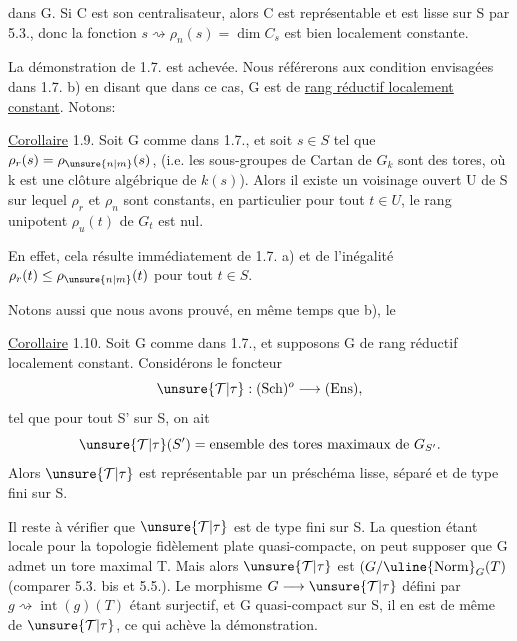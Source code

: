 dans G. Si C est son centralisateur, alors C est représentable et est
lisse sur S par  5.3., donc la fonction
$s\rightsquigarrow\rho_n(s)=\dim C_s$ est bien
localement constante.

La démonstration de 1.7. est achevée. Nous référerons aux
condition envisagées dans 1.7. b) en disant que dans ce cas, G est
de \uline{rang réductif localement constant}. Notons:

\uline{Corollaire} 1.9. Soit G comme dans 1.7., et soit $s\in S$ tel que
$\rho_r(s)=\rho_{\unsure{n|m}}(s)$, (i.e. les sous-groupes de Cartan de $G_k$ sont des tores, où k
est une clôture algébrique de $k(s)$). Alors il existe un voisinage 
ouvert U de S sur lequel $\rho_r$ et $\rho_n$ sont constants, en particulier pour
tout $t\in U$, le rang unipotent $\rho_u(t)$ de $G_t$ est nul.

En effet,  cela
résulte immédiatement de 1.7. a) et de l'inégalité $\rho_r(t)\le\rho_{\unsure{n|m}}(t)$ pour
tout $t\in S$.

Notons aussi que nous avons prouvé, en même temps que b), le

\uline{Corollaire} 1.10. Soit G comme dans 1.7., et supposons G de rang
réductif localement constant. Considérons le foncteur
\[
\unsure{\mathcal T|\tau}:(\mathrm{Sch})^o\longrightarrow(\mathrm{Ens}),
\]
tel que pour tout S' sur S, on ait
\[
\unsure{\mathcal T|\tau}(S')=\text{ensemble des tores maximaux de }G_{S'}.
\]
Alors $\unsure{\mathcal T|\tau}$ est représentable par un préschéma lisse, séparé et de
type fini sur S.

Il reste à vérifier que $\unsure{\mathcal T|\tau}$ est  de type fini sur S. La
question étant locale pour la topologie fidèlement plate quasi-compacte,
on peut supposer que G admet un tore maximal T. Mais alors $\unsure{\mathcal T|\tau}$
 est
$(G/\uline{\operatorname{Norm}}_G(T)$ (comparer  5.3. bis et 5.5.).
 Le morphisme
$G\longrightarrow\unsure{\mathcal T|\tau}$ défini par $g\rightsquigarrow\operatorname{int}(g)(T)$ étant surjectif,
et G quasi-compact
sur S, il en est de même de $\unsure{\mathcal T|\tau}$, ce qui achève la démonstration.
